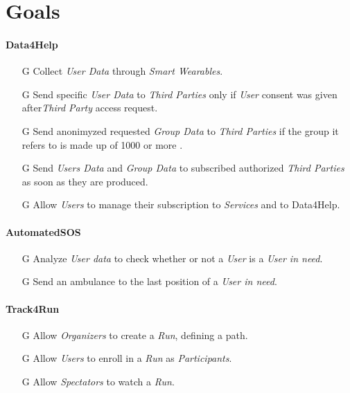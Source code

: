 \documentclass[../../rasd.tex]{subfiles}
\begin{document}
\section{Goals}

\paragraph{Data4Help}
\begin{itemize}
	
	\item[G\subs{1}]Collect \textit{User Data} through \textit{Smart Wearables}.
	
	\item[G\subs{2}]Send specific \textit{User Data} to \textit{Third Parties} only if \textit{User} consent was given after\textit{Third Party} access request.
	\item[G\subs{3}]Send anonimyzed requested \textit{Group Data} to \textit{Third Parties} if the group it refers to is made up of 1000 or more .

	\item[G\subs{4}]Send \textit{Users Data} and \textit{Group Data} to subscribed authorized \textit{Third Parties} as soon as they are produced.
	
	\item[G\subs{5}]Allow \textit{Users} to manage their subscription to \textit{Services} and to Data4Help.		
	
\end{itemize}

\paragraph{AutomatedSOS}
\begin{itemize}
	\item[G\subs{6}]Analyze \textit{User data} to check whether or not a \textit{User} is a \textit{User in need}.
	\item[G\subs{7}]Send an ambulance to the last position of a \textit{User in need}.
\end{itemize}

\paragraph{Track4Run}
\begin{itemize}
	\item[G\subs{8}]Allow \textit{Organizers} to create a \textit{Run}, defining a path.
	\item[G\subs{9}]Allow \textit{Users} to enroll in a \textit{Run} as \textit{Participants}. 
	\item[G\subs{10}]Allow \textit{Spectators} to watch a \textit{Run}.
\end{itemize}
\end{document}
